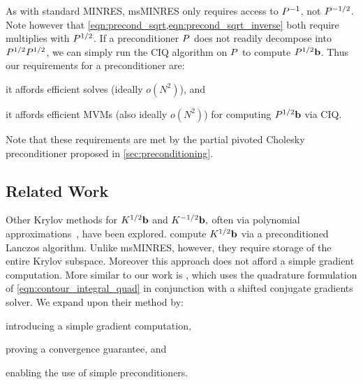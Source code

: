 As with standard MINRES, msMINRES only requires access to $P^{-1}$, not $P^{-1/2}$.
Note however that \cref{eqn:precond_sqrt,eqn:precond_sqrt_inverse} both require multiplies with $P^{1/2}$.
If a preconditioner $P$ does not readily decompose into $P^{1/2} P^{1/2}$, we can simply run the CIQ algorithm on $P$ to compute $P^{1/2} \mathbf{b}$.
Thus our requirements for a preconditioner are:
\begin{enumerate*}
	\item it affords efficient solves (ideally $o(N^2)$), and
  \item it affords efficient MVMs (also ideally $o(N^2)$) for computing $P^{1/2} \mathbf{b}$ via CIQ.
\end{enumerate*}
%
Note that these requirements are met by the partial pivoted Cholesky preconditioner proposed in \cref{sec:preconditioning}.






\subsection{Related Work}
Other Krylov methods for $K^{1/2} \mathbf{b}$ and $K^{-1/2} \mathbf{b},$ often via polynomial approximations~\citep[e.g.][]{higham2008functions}, have been explored.
\citet{chow2014preconditioned} compute $K^{1/2} \mathbf{b}$ via a preconditioned Lanczos algorithm.
Unlike msMINRES, however, they require storage of the entire Krylov subspace. Moreover this approach does not afford a simple gradient computation.
More similar to our work is \cite{aune2013iterative,aune2014parameter}, which uses the quadrature formulation of \cref{eqn:contour_integral_quad} in conjunction with a shifted conjugate gradients solver.
We expand upon their method by:
\begin{enumerate*}
  \item introducing a simple gradient computation,
  \item proving a convergence guarantee, and
  \item enabling the use of simple preconditioners.
\end{enumerate*}
